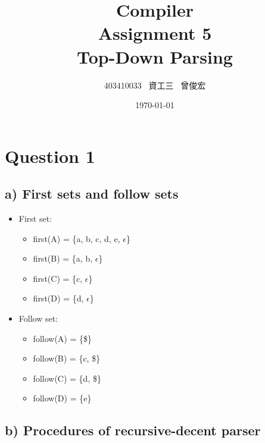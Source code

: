 \documentclass[12pt, A4]{article}
\title{Compiler \\ Assignment 5 \\ Top-Down Parsing}
\author{403410033 \ 資工三 \ 曾俊宏}
\date{\today}
\begin{document}
	
	\maketitle
	\newpage

	\section{Question 1}
	
	\subsection*{a) First sets and follow sets}
	
	\begin{itemize}
		\item First set: 
            \begin{itemize}
                \item first(A) = \{a, b, c, d, e, $\epsilon$\}
                \item first(B) = \{a, b, $\epsilon$\}
                \item first(C) = \{c, $\epsilon$\}
                \item first(D) = \{d, $\epsilon$\}
            \end{itemize}
		\item Follow set:
            \begin{itemize}
                \item follow(A) = \{\$\}
                \item follow(B) = \{c, \$\}
                \item follow(C) = \{d, \$\}
                \item follow(D) = \{e\}
            \end{itemize}
	\end{itemize}
	
    \newpage
	\subsection*{b) Procedures of recursive-decent parser}
	
\end{document}
